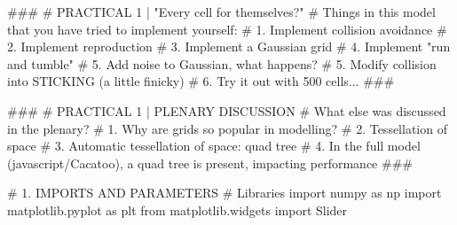 \documentclass[
  letterpaper,
  DIV=11,
  numbers=noendperiod]{scrreprt}
\newenvironment{Shaded}{\begin{snugshade}}{\end{snugshade}}
\newcommand{\CommentTok}[1]{\textcolor[rgb]{0.37,0.37,0.37}{#1}}
\newcommand{\ImportTok}[1]{\textcolor[rgb]{0.00,0.46,0.62}{#1}}
\newcommand{\NormalTok}[1]{\textcolor[rgb]{0.00,0.23,0.31}{#1}}
\theoremstyle{definition}
\theoremstyle{remark}
\begin{document}
\begin{tcolorbox}[enhanced jigsaw, leftrule=.75mm, colbacktitle=quarto-callout-note-color!10!white, coltitle=black, colback=white, left=2mm, bottomtitle=1mm, arc=.35mm, titlerule=0mm, breakable, bottomrule=.15mm, opacitybacktitle=0.6, colframe=quarto-callout-note-color-frame, title=\textcolor{quarto-callout-note-color}{\faInfo}\hspace{0.5em}{Final code}, opacityback=0, toprule=.15mm, toptitle=1mm, rightrule=.15mm]

\begin{Shaded}
\begin{Highlighting}[]

\CommentTok{\#\#\#}
\CommentTok{\# PRACTICAL 1 | "Every cell for themselves?"}
\CommentTok{\# Things in this model that you have tried to implement yourself:}
\CommentTok{\# 1. Implement collision avoidance}
\CommentTok{\# 2. Implement reproduction}
\CommentTok{\# 3. Implement a Gaussian grid}
\CommentTok{\# 4. Implement "run and tumble"}
\CommentTok{\# 5. Add noise to Gaussian, what happens?}
\CommentTok{\# 5. Modify collision into STICKING (a little finicky)}
\CommentTok{\# 6. Try it out with 500 cells... }
\CommentTok{\#\#\#}

\CommentTok{\#\#\#}
\CommentTok{\# PRACTICAL 1 | PLENARY DISCUSSION}
\CommentTok{\# What else was discussed in the plenary?}
\CommentTok{\# 1. Why are grids so popular in modelling?}
\CommentTok{\# 2. Tessellation of space}
\CommentTok{\# 3. Automatic tessellation of space: quad tree}
\CommentTok{\# 4. In the full model (javascript/Cacatoo), a quad tree is present, impacting performance}
\CommentTok{\#\#\#}

\CommentTok{\# 1. IMPORTS AND PARAMETERS}
\CommentTok{\# Libraries}
\ImportTok{import}\NormalTok{ numpy }\ImportTok{as}\NormalTok{ np}
\ImportTok{import}\NormalTok{ matplotlib.pyplot }\ImportTok{as}\NormalTok{ plt}
\ImportTok{from}\NormalTok{ matplotlib.widgets }\ImportTok{import}\NormalTok{ Slider}


\end{Highlighting}
\end{Shaded}
\end{tcolorbox}
\end{document}
